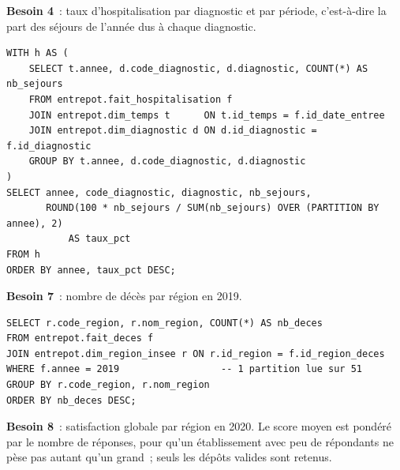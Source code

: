 \noindent \textbf{Besoin 4}~: taux d'hospitalisation par diagnostic et par période, c'est-à-dire la part des séjours de l'année dus à chaque diagnostic.

\begin{center}
\begin{minipage}{0.92\textwidth}
\begin{tcolorbox}[colback=title2!6,colframe=title1,boxsep=2pt]
\begin{verbatim}
WITH h AS (
    SELECT t.annee, d.code_diagnostic, d.diagnostic, COUNT(*) AS nb_sejours
    FROM entrepot.fait_hospitalisation f
    JOIN entrepot.dim_temps t      ON t.id_temps = f.id_date_entree
    JOIN entrepot.dim_diagnostic d ON d.id_diagnostic = f.id_diagnostic
    GROUP BY t.annee, d.code_diagnostic, d.diagnostic
)
SELECT annee, code_diagnostic, diagnostic, nb_sejours,
       ROUND(100 * nb_sejours / SUM(nb_sejours) OVER (PARTITION BY annee), 2)
           AS taux_pct
FROM h
ORDER BY annee, taux_pct DESC;
\end{verbatim}
\end{tcolorbox}
\end{minipage}
\end{center}

\noindent \textbf{Besoin 7}~: nombre de décès par région en 2019.

\begin{center}
\begin{minipage}{0.92\textwidth}
\begin{tcolorbox}[colback=title2!6,colframe=title1,boxsep=2pt]
\begin{verbatim}
SELECT r.code_region, r.nom_region, COUNT(*) AS nb_deces
FROM entrepot.fait_deces f
JOIN entrepot.dim_region_insee r ON r.id_region = f.id_region_deces
WHERE f.annee = 2019                  -- 1 partition lue sur 51
GROUP BY r.code_region, r.nom_region
ORDER BY nb_deces DESC;
\end{verbatim}
\end{tcolorbox}
\end{minipage}
\end{center}

\noindent \textbf{Besoin 8}~: satisfaction globale par région en 2020. Le score moyen est pondéré par le nombre de réponses, pour qu'un établissement avec peu de répondants ne pèse pas autant qu'un grand~; seuls les dépôts valides sont retenus.

